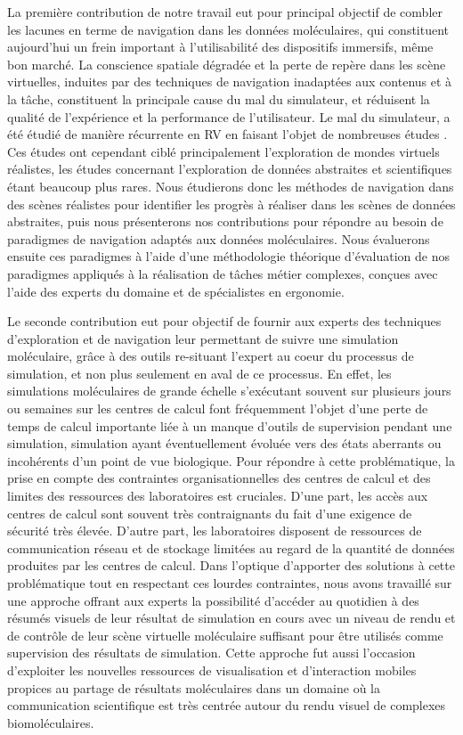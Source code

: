 La première contribution de notre travail eut pour principal objectif de combler les lacunes en terme de navigation dans les données moléculaires, qui constituent aujourd'hui un frein important à l'utilisabilité des dispositifs immersifs, même bon marché. La conscience spatiale dégradée et la perte de repère dans les scène virtuelles, induites par des techniques de navigation inadaptées aux contenus et à la tâche, constituent la principale cause du mal du simulateur, et réduisent la qualité de l'expérience et la performance de l'utilisateur. Le mal du simulateur, a été étudié de manière récurrente en RV en faisant l'objet de nombreuses études \cite{laviola_jr_discussion_2000,davis2014systematic}. Ces études ont cependant ciblé principalement l'exploration de mondes virtuels réalistes, les études concernant l'exploration de données abstraites et scientifiques étant beaucoup plus rares. Nous étudierons donc les méthodes de navigation dans des scènes réalistes pour identifier les progrès à réaliser dans les scènes de données abstraites, puis nous présenterons nos contributions pour répondre au besoin de paradigmes de navigation adaptés aux données moléculaires. Nous évaluerons ensuite ces paradigmes à l'aide d'une méthodologie théorique d'évaluation de nos paradigmes appliqués à la réalisation de tâches métier complexes, conçues avec l'aide des experts du domaine et de spécialistes en ergonomie.

Le seconde contribution eut pour objectif de fournir aux experts des techniques d'exploration et de navigation leur permettant de suivre une simulation moléculaire, grâce à des outils re-situant l'expert au coeur du processus de simulation, et non plus seulement en aval de ce processus. En effet, les simulations moléculaires de grande échelle s’exécutant souvent sur plusieurs jours ou semaines sur les centres de calcul font fréquemment l'objet d'une perte de temps de calcul importante liée à un manque d'outils de supervision pendant une simulation, simulation ayant éventuellement évoluée vers des états aberrants ou incohérents d'un point de vue biologique. Pour répondre à cette problématique, la prise en compte des contraintes organisationnelles des centres de calcul et des limites des ressources des laboratoires est cruciales. D'une part, les accès aux centres de calcul sont souvent très contraignants du fait d'une exigence de sécurité très élevée. D'autre part, les laboratoires disposent de ressources de communication réseau et de stockage limitées au regard de la quantité de données produites par les centres de calcul. Dans l'optique d'apporter des solutions à cette problématique tout en respectant ces lourdes contraintes, nous avons travaillé sur une approche offrant aux experts la possibilité d'accéder au quotidien à des résumés visuels de leur résultat de simulation en cours avec un niveau de rendu et de contrôle de leur scène virtuelle moléculaire suffisant pour être utilisés comme supervision des résultats de simulation. Cette approche fut aussi l'occasion d'exploiter les nouvelles ressources de visualisation et d'interaction mobiles propices au partage de résultats moléculaires dans un domaine où la communication scientifique est très centrée autour du rendu visuel de complexes biomoléculaires.

